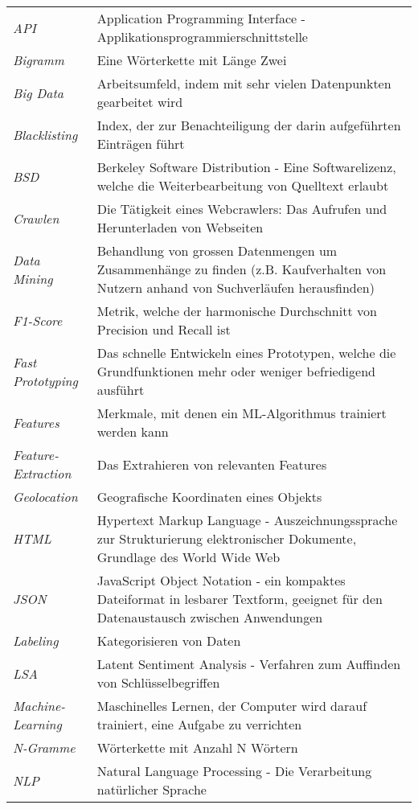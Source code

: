 \begin{table}[H]
	\begin{tabular}{>{\em}p{4cm}p{12cm}}
		API & Application Programming Interface - Applikationsprogrammierschnittstelle\\
		Bigramm & Eine Wörterkette mit Länge Zwei\\
		Big Data & Arbeitsumfeld, indem mit sehr vielen Datenpunkten gearbeitet wird\\
		Blacklisting & Index, der zur Benachteiligung der darin aufgeführten Einträgen führt\\
		BSD & Berkeley Software Distribution - Eine Softwarelizenz, welche die Weiterbearbeitung von Quelltext erlaubt\\
		Crawlen & Die Tätigkeit eines Webcrawlers: Das Aufrufen und Herunterladen von Webseiten\\
		Data Mining & Behandlung von grossen Datenmengen um Zusammenhänge zu finden (z.B. Kaufverhalten von Nutzern anhand von Suchverläufen herausfinden)\\
		F1-Score & Metrik, welche der harmonische Durchschnitt von Precision und Recall ist\\
		Fast Prototyping & Das schnelle Entwickeln eines Prototypen, welche die Grundfunktionen mehr oder weniger befriedigend ausführt\\
		Features & Merkmale, mit denen ein ML-Algorithmus trainiert werden kann\\
		Feature-Extraction & Das Extrahieren von relevanten Features\\
		Geolocation & Geografische Koordinaten eines Objekts\\
		HTML & Hypertext Markup Language - Auszeichnungssprache zur Strukturierung elektronischer Dokumente, Grundlage des World Wide Web\\
		JSON & JavaScript Object Notation - ein kompaktes Dateiformat in lesbarer Textform, geeignet für den Datenaustausch zwischen Anwendungen\\
		Labeling & Kategorisieren von Daten\\
		LSA & Latent Sentiment Analysis - Verfahren zum Auffinden von Schlüsselbegriffen\\
		Machine-Learning & Maschinelles Lernen, der Computer wird darauf trainiert, eine Aufgabe zu verrichten\\
		N-Gramme & Wörterkette mit Anzahl N Wörtern\\
		NLP & Natural Language Processing - Die Verarbeitung natürlicher Sprache\\

\end{tabular}
\end{table}
